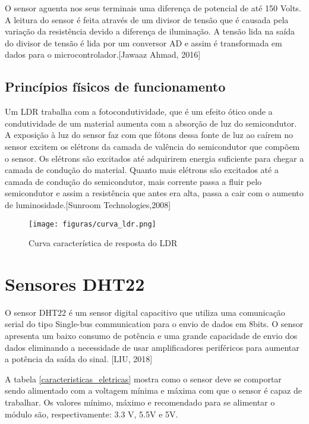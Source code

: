 O sensor aguenta nos seus terminais uma diferença de potencial de até 150 Volts. A leitura do sensor é feita através de um divisor de tensão que é causada pela variação da resistência devido a diferença de iluminação. A tensão lida na saída do divisor de tensão é lida por um conversor AD e assim é transformada em dados para o microcontrolador\cite{ahmad2016}.[Jawaaz Ahmad, 2016]

\subsection{Princípios físicos de funcionamento}

Um LDR trabalha com a fotocondutividade, que é um efeito ótico onde a condutividade de um material aumenta com a absorção de luz do semicondutor. A exposição à luz do sensor faz com que fótons dessa fonte de luz ao caírem no sensor excitem os elétrons da camada de valência do semicondutor que compõem o sensor. Os elétrons são excitados até adquirirem energia suficiente para chegar a camada de condução do material. Quanto mais elétrons são excitados até a camada de condução do semicondutor, mais corrente passa a fluir pelo semicondutor e assim a resistência que antes era alta, passa a cair com o aumento de luminosidade\cite{sunroom2008}.[Sunroom Technologies,2008]

\begin{figure}[H]
	\centering
	\texttt{[image: figuras/curva\_ldr.png]}
	\caption{Curva característica de resposta do LDR} \label{curva_ldr}
\end{figure}

\section{Sensores DHT22}

O sensor DHT22 é um sensor digital capacitivo que utiliza uma comunicação serial do tipo Single-bus communication para o envio de dados em 8bits. O sensor apresenta um baixo consumo de potência e uma grande capacidade de envio dos dados eliminando a necessidade de usar amplificadores periféricos para aumentar a potência da saída do sinal\cite{liu2018}. [LIU, 2018]

A tabela \ref{caracteristicas_eletricas} mostra como o sensor deve se comportar sendo alimentado com a voltagem mínima e máxima com que o sensor é capaz de trabalhar. Os valores mínimo, máximo e recomendado para se alimentar o módulo são, respectivamente: 3.3 V, 5.5V e 5V.

